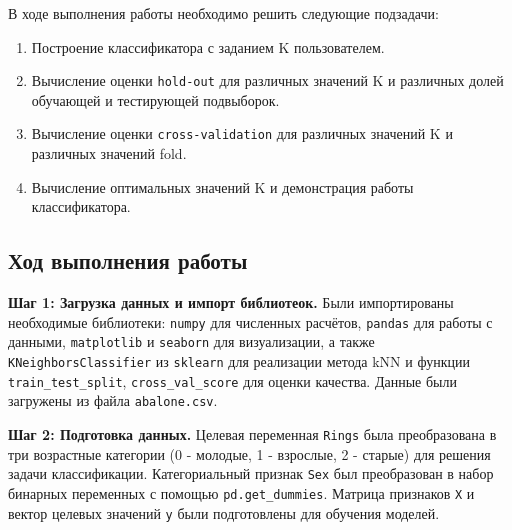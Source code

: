 В ходе выполнения работы необходимо решить следующие подзадачи:
\begin{enumerate}
    \item Построение классификатора с заданием K пользователем.
    \item Вычисление оценки \texttt{hold-out} для различных значений K и различных долей обучающей и тестирующей подвыборок.
    \item Вычисление оценки \texttt{cross-validation} для различных значений K и различных значений fold.
    \item Вычисление оптимальных значений K и демонстрация работы классификатора.
\end{enumerate}

\subsection{Ход выполнения работы}

\textbf{Шаг 1: Загрузка данных и импорт библиотеок.}
Были импортированы необходимые библиотеки: \texttt{numpy} для численных расчётов, \texttt{pandas} для работы с данными, \texttt{matplotlib} и \texttt{seaborn} для визуализации, а также \texttt{KNeighborsClassifier} из \texttt{sklearn} для реализации метода kNN и функции \texttt{train\_test\_split}, \texttt{cross\_val\_score} для оценки качества. Данные были загружены из файла \texttt{abalone.csv}.

\textbf{Шаг 2: Подготовка данных.}
Целевая переменная \texttt{Rings} была преобразована в три возрастные категории (0 - молодые, 1 - взрослые, 2 - старые) для решения задачи классификации. Категориальный признак \texttt{Sex} был преобразован в набор бинарных переменных с помощью \texttt{pd.get\_dummies}. Матрица признаков \texttt{X} и вектор целевых значений \texttt{y} были подготовлены для обучения моделей.

